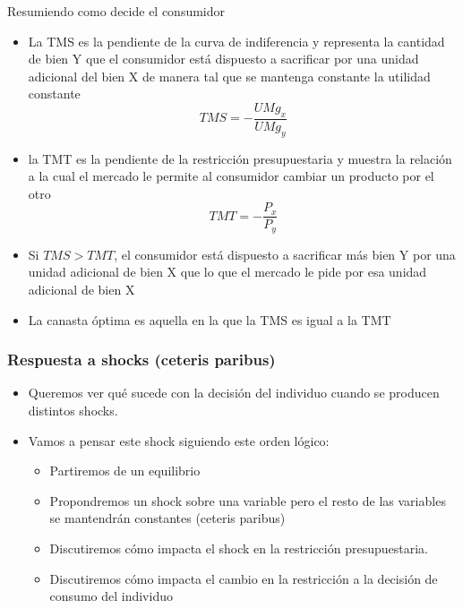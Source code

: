 \documentclass{beamer}
\begin{document}
\begin{frame}{Resumiendo como decide el consumidor}
    \begin{itemize}
        \item La TMS es la pendiente de la curva de indiferencia y representa la cantidad de bien Y que el consumidor está dispuesto a sacrificar por una unidad adicional del bien X de manera tal que se mantenga constante la utilidad constante
        \[TMS = - \frac{UMg_x}{UMg_y}\]
        \item la TMT es la pendiente de la restricción presupuestaria y muestra la relación a la cual el mercado le permite al consumidor cambiar un producto por el otro
        \[TMT = - \frac{P_x}{P_y}\]
        \item Si $TMS > TMT$, el consumidor está dispuesto a sacrificar más bien Y por una unidad adicional de bien X que lo que el mercado le pide por esa unidad adicional de bien X
        \item La canasta óptima es aquella en la que la TMS es igual a la TMT
    \end{itemize}
\end{frame}

\begin{frame}
\frametitle{Respuesta a shocks (ceteris paribus)}
\begin{itemize}
    \item Queremos ver qué sucede con la decisión del individuo cuando se producen distintos shocks. \vspace{2mm}
    \item Vamos a pensar este shock siguiendo este orden lógico:
    \begin{itemize}
        \item Partiremos de un equilibrio
        \item Propondremos un shock sobre una variable pero el resto de las variables se mantendrán constantes (ceteris paribus)
        \item Discutiremos cómo impacta el shock en la restricción presupuestaria.      
        \item Discutiremos cómo impacta el cambio en la restricción a la decisión de consumo del individuo
    \end{itemize}
\end{itemize} 
\end{frame}
\end{document}
